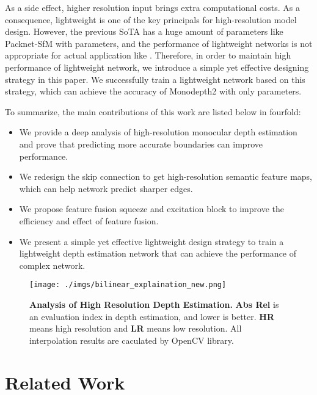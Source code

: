 \documentclass[letterpaper]{article} \usepackage{aaai21}  \usepackage{times}  \usepackage{helvet} \usepackage{courier}  \usepackage[hyphens]{url}  \usepackage{graphicx} \urlstyle{rm} \def\UrlFont{\rm}  \usepackage{natbib}  \usepackage{caption} \frenchspacing  \setlength{\pdfpagewidth}{8.5in}  \setlength{\pdfpageheight}{11in}  \usepackage{booktabs}
\begin{document}
As a side effect, higher resolution input brings extra computational costs. As a consequence, lightweight is one of the key principals for high-resolution model design. However, the previous 
SoTA has a huge amount of parameters like Packnet-SfM with  parameters, and the performance of lightweight networks is not appropriate for actual application 
like \cite{poggi2018towards}. Therefore, in order to maintain high performance of lightweight network, we introduce a simple yet effective designing strategy in this paper. We successfully 
train a lightweight network based on this strategy, which can achieve the accuracy of Monodepth2 with only  parameters.

To summarize, the main contributions of this work are listed below in fourfold:
\begin{itemize}
    \item We provide a deep analysis of high-resolution monocular depth estimation and prove that predicting more accurate boundaries can improve performance.
    \item We redesign the skip connection to get high-resolution semantic feature maps, which can help network predict sharper edges.
    \item We propose feature fusion squeeze and excitation block to improve the efficiency and effect of feature fusion.
    \item We present a simple yet effective lightweight design strategy to train a lightweight depth estimation network that can achieve the performance of complex network.
\end{itemize}


\begin{figure*}[ht]
    \centering
    \texttt{[image: ./imgs/bilinear\_explaination\_new.png]} 
    \caption{\textbf{Analysis of High Resolution Depth Estimation.}  \textbf{Abs Rel} is an evaluation index in depth estimation, and lower is better. \textbf{HR} means high resolution and \textbf{LR} 
    means low resolution. All interpolation results are caculated by OpenCV library.}
\label{fig2}
\end{figure*}

\section{Related Work}
\end{document}
